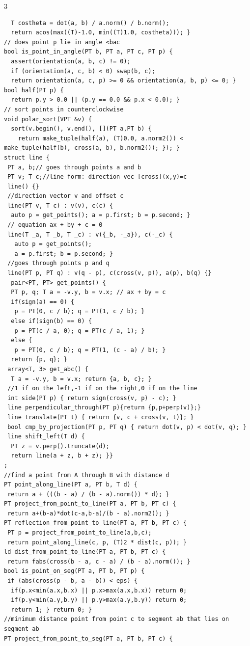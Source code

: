 \documentclass[8pt,a4paper,onesided]{article}
\begin{document}
\begin{multicols}{3}
\begin{verbatim}
  T costheta = dot(a, b) / a.norm() / b.norm();
  return acos(max((T)-1.0, min((T)1.0, costheta))); }
// does point p lie in angle <bac
bool is_point_in_angle(PT b, PT a, PT c, PT p) {
  assert(orientation(a, b, c) != 0);
  if (orientation(a, c, b) < 0) swap(b, c);
  return orientation(a, c, p) >= 0 && orientation(a, b, p) <= 0; }
bool half(PT p) {
  return p.y > 0.0 || (p.y == 0.0 && p.x < 0.0); }
// sort points in counterclockwise
void polar_sort(VPT &v) {
  sort(v.begin(), v.end(), [](PT a,PT b) {
    return make_tuple(half(a), (T)0.0, a.norm2()) < make_tuple(half(b), cross(a, b), b.norm2()); }); } 
struct line {
 PT a, b;// goes through points a and b
 PT v; T c;//line form: direction vec [cross](x,y)=c 
 line() {}
 //direction vector v and offset c
 line(PT v, T c) : v(v), c(c) {
  auto p = get_points(); a = p.first; b = p.second; }
 // equation ax + by + c = 0
 line(T _a, T _b, T _c) : v({_b, -_a}), c(-_c) {
   auto p = get_points();
   a = p.first; b = p.second; }
 //goes through points p and q
 line(PT p, PT q) : v(q - p), c(cross(v, p)), a(p), b(q) {}
  pair<PT, PT> get_points() {
  PT p, q; T a = -v.y, b = v.x; // ax + by = c
  if(sign(a) == 0) {
   p = PT(0, c / b); q = PT(1, c / b); }
  else if(sign(b) == 0) {
   p = PT(c / a, 0); q = PT(c / a, 1); }
  else {
   p = PT(0, c / b); q = PT(1, (c - a) / b); }
  return {p, q}; }
 array<T, 3> get_abc() {
  T a = -v.y, b = v.x; return {a, b, c}; }
 //1 if on the left,-1 if on the right,0 if on the line
 int side(PT p) { return sign(cross(v, p) - c); }
 line perpendicular_through(PT p){return {p,p+perp(v)};}
 line translate(PT t) { return {v, c + cross(v, t)}; }
 bool cmp_by_projection(PT p, PT q) { return dot(v, p) < dot(v, q); }
 line shift_left(T d) {
  PT z = v.perp().truncate(d);
  return line(a + z, b + z); }}
;
//find a point from A through B with distance d
PT point_along_line(PT a, PT b, T d) {
 return a + (((b - a) / (b - a).norm()) * d); }
PT project_from_point_to_line(PT a, PT b, PT c) {
 return a+(b-a)*dot(c-a,b-a)/(b - a).norm2(); }
PT reflection_from_point_to_line(PT a, PT b, PT c) {
 PT p = project_from_point_to_line(a,b,c);
 return point_along_line(c, p, (T)2 * dist(c, p)); }
ld dist_from_point_to_line(PT a, PT b, PT c) {
 return fabs(cross(b - a, c - a) / (b - a).norm()); }
bool is_point_on_seg(PT a, PT b, PT p) {
 if (abs(cross(p - b, a - b)) < eps) {
  if(p.x<min(a.x,b.x) || p.x>max(a.x,b.x)) return 0;
  if(p.y<min(a.y,b.y) || p.y>max(a.y,b.y)) return 0;
  return 1; } return 0; }
//minimum distance point from point c to segment ab that lies on segment ab
PT project_from_point_to_seg(PT a, PT b, PT c) {

\end{verbatim}
\end{multicols}
\end{document}
